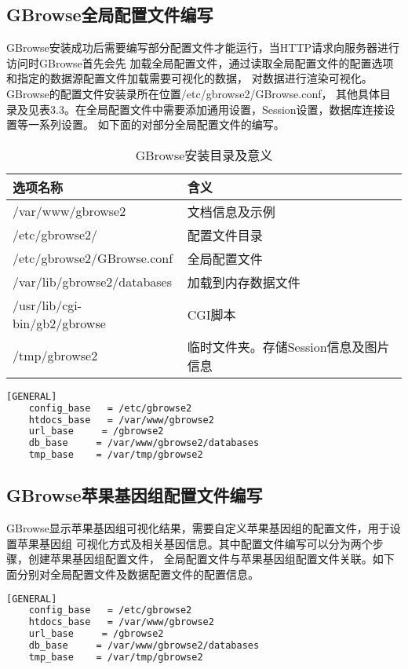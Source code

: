 	\subsection{GBrowse全局配置文件编写}
	GBrowse安装成功后需要编写部分配置文件才能运行，当HTTP请求向服务器进行访问时GBrowse首先会先
	加载全局配置文件，通过读取全局配置文件的配置选项和指定的数据源配置文件加载需要可视化的数据，
	对数据进行渲染可视化。GBrowse的配置文件安装录所在位置/etc/gbrowse2/GBrowse.conf，
	其他具体目录及见表3.3。在全局配置文件中需要添加通用设置，Session设置，数据库连接设置等一系列设置。
	如下面的对部分全局配置文件的编写。
	\begin{table}[!htbp]
		\centering
		\begin{tabular}{ll}	
			\toprule
			选项名称& 含义\\
			\midrule
			/var/www/gbrowse2&文档信息及示例\\
			/etc/gbrowse2/&配置文件目录\\
			/etc/gbrowse2/GBrowse.conf&全局配置文件\\
			/var/lib/gbrowse2/databases&加载到内存数据文件 \\
			/usr/lib/cgi-bin/gb2/gbrowse&CGI脚本\\
			/tmp/gbrowse2&临时文件夹。存储Session信息及图片信息\\
			\bottomrule
		\end{tabular}
		\caption{GBrowse安装目录及意义}
	\end{table}
	\begin{lstlisting}[language=bash]
	[GENERAL]
	config_base   = /etc/gbrowse2   
	htdocs_base   = /var/www/gbrowse2
	url_base     = /gbrowse2
	db_base     = /var/www/gbrowse2/databases
	tmp_base    = /var/tmp/gbrowse2
	\end{lstlisting}
	\subsection{GBrowse苹果基因组配置文件编写}
	GBrowse显示苹果基因组可视化结果，需要自定义苹果基因组的配置文件，用于设置苹果基因组
	可视化方式及相关基因信息。其中配置文件编写可以分为两个步骤，创建苹果基因组配置文件，
	全局配置文件与苹果基因组配置文件关联。如下面分别对全局配置文件及数据配置文件的配置信息。
	\begin{lstlisting}[language=bash]
	[GENERAL]
	config_base   = /etc/gbrowse2   
	htdocs_base   = /var/www/gbrowse2
	url_base     = /gbrowse2
	db_base     = /var/www/gbrowse2/databases
	tmp_base    = /var/tmp/gbrowse2
	\end{lstlisting}
	
